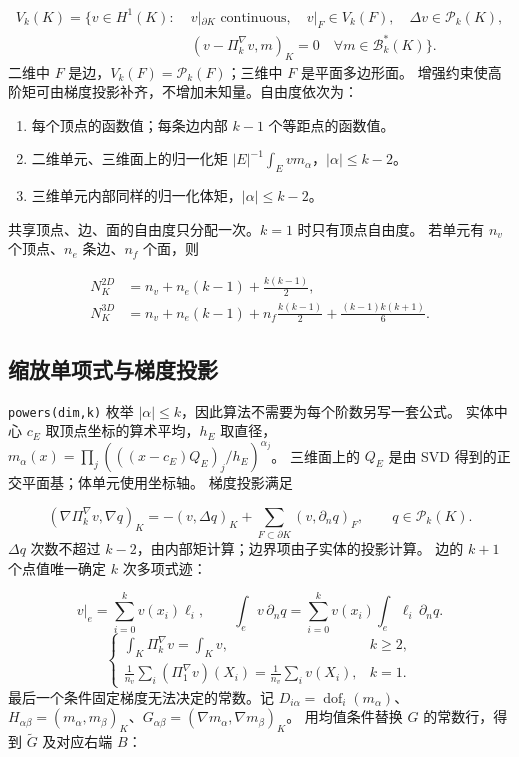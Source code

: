\documentclass[UTF8,11pt,oneside]{ctexbook}
\theoremstyle{definition}
\theoremstyle{plain}
\newcommand{\code}[1]{\texttt{#1}}
\begin{document}
\begin{equation}
\begin{split}
V_k(K)=\{v\in H^1(K):\;&v|_{\partial K}\text{ continuous},\quad
v|_F\in V_k(F),\quad \Delta v\in\mathcal P_k(K),\\
&(v-\Pi_k^\nabla v,m)_K=0\quad\forall m\in\mathcal B_k^*(K)\}.
\end{split}
\label{eq:vem-space}
\end{equation}
二维中 $F$ 是边，$V_k(F)=\mathcal P_k(F)$；三维中 $F$ 是平面多边形面。
增强约束使高阶矩可由梯度投影补齐，不增加未知量。自由度依次为：
\begin{enumerate}[itemsep=0.2em]
\item 每个顶点的函数值；每条边内部 $k-1$ 个等距点的函数值。
\item 二维单元、三维面上的归一化矩 $|E|^{-1}\int_E v m_\alpha$，$|\alpha|\le k-2$。
\item 三维单元内部同样的归一化体矩，$|\alpha|\le k-2$。
\end{enumerate}
共享顶点、边、面的自由度只分配一次。$k=1$ 时只有顶点自由度。
若单元有 $n_v$ 个顶点、$n_e$ 条边、$n_f$ 个面，则

\begin{align*}
N_K^{2D}&=n_v+n_e(k-1)+\frac{k(k-1)}2,\\
N_K^{3D}&=n_v+n_e(k-1)+n_f\frac{k(k-1)}2+
\frac{(k-1)k(k+1)}6.
\end{align*}

\subsection{缩放单项式与梯度投影}
\code{powers(dim,\allowbreak k)} 枚举 $|\alpha|\le k$，因此算法不需要为每个阶数另写一套公式。
实体中心 $c_E$ 取顶点坐标的算术平均，$h_E$ 取直径，
$m_\alpha(x)=\prod_j(((x-c_E)Q_E)_j/h_E)^{\alpha_j}$。
三维面上的 $Q_E$ 是由 SVD 得到的正交平面基；体单元使用坐标轴。
梯度投影满足

\begin{equation}
(\nabla\Pi_k^\nabla v,\nabla q)_K
=-(v,\Delta q)_K+\sum_{F\subset\partial K}(v,\partial_n q)_F,
\qquad q\in\mathcal P_k(K).
\label{eq:vem-proj}
\end{equation}
$\Delta q$ 次数不超过 $k-2$，由内部矩计算；边界项由子实体的投影计算。
边的 $k+1$ 个点值唯一确定 $k$ 次多项式迹：

\begin{equation}
v|_e=\sum_{i=0}^{k}v(x_i)\ell_i,\qquad
\int_e v\,\partial_nq=\sum_{i=0}^{k}v(x_i)\int_e\ell_i\,\partial_nq.
\label{eq:vem-edge}
\end{equation}
\begin{equation}
\begin{cases}
\displaystyle\int_K\Pi_k^\nabla v=\int_Kv,& k\ge2,\\
\displaystyle\frac1{n_v}\sum_i(\Pi_1^\nabla v)(X_i)
=\frac1{n_v}\sum_i v(X_i),&k=1.
\end{cases}
\label{eq:vem-const}
\end{equation}
最后一个条件固定梯度无法决定的常数。记 $D_{i\alpha}=\operatorname{dof}_i(m_\alpha)$、
$H_{\alpha\beta}=(m_\alpha,m_\beta)_K$、$G_{\alpha\beta}=(\nabla m_\alpha,\nabla m_\beta)_K$。
用均值条件替换 $G$ 的常数行，得到 $\widetilde G$ 及对应右端 $B$：
\end{document}
